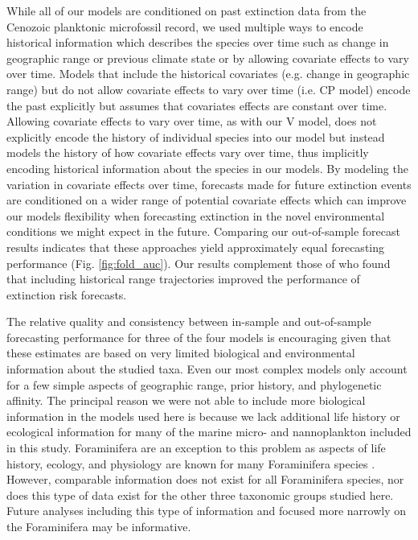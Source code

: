 \documentclass[12pt,letterpaper]{article}
\begin{document}
\begin{refsection}
While all of our models are conditioned on past extinction data from the Cenozoic planktonic microfossil record, we used multiple ways to encode historical information which describes the species over time such as change in geographic range or previous climate state or by allowing covariate effects to vary over time. Models that include the historical covariates (e.g. change in geographic range) but do not allow covariate effects to vary over time (i.e. CP model) encode the past explicitly but assumes that covariates effects are constant over time. Allowing covariate effects to vary over time, as with our V model, does not explicitly encode the history of individual species into our model but instead models the history of how covariate effects vary over time, thus implicitly encoding historical information about the species in our models. By modeling the variation in covariate effects over time, forecasts made for future extinction events are conditioned on a wider range of potential covariate effects which can improve our models flexibility when forecasting extinction in the novel environmental conditions we might expect in the future. Comparing our out-of-sample forecast results indicates that these approaches yield approximately equal forecasting performance (Fig. \ref{fig:fold_auc}). Our results complement those of \citet{Kiessling2016} who found that including historical range trajectories improved the performance of extinction risk forecasts.

The relative quality and consistency between in-sample and out-of-sample forecasting performance for three of the four models is encouraging given that these estimates are based on very limited biological and environmental information about the studied taxa. Even our most complex models only account for a few simple aspects of geographic range, prior history, and phylogenetic affinity. The principal reason we were not able to include more biological information in the models used here is because we lack additional life history or ecological information for many of the marine micro- and nannoplankton included in this study. Foraminifera are an exception to this problem as aspects of life history, ecology, and physiology are known for many Foraminifera species \citep{Ezard2011}. However, comparable information does not exist for all Foraminifera species, nor does this type of data exist for the other three taxonomic groups studied here. Future analyses including this type of information and focused more narrowly on the Foraminifera may be informative. 


\end{refsection}
\end{document}
